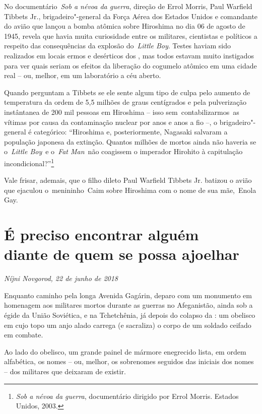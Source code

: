 No documentário~\emph{Sob a névoa da guerra}, direção de Errol Morris,
Paul Warfield Tibbets Jr., brigadeiro"-general da Força Aérea dos Estados
Unidos e comandante do avião que lançou a bomba atômica sobre Hiroshima
no dia 06 de agosto de 1945, revela que havia muita curiosidade entre os
militares, cientistas e políticos a respeito das consequências da
explosão do~\emph{Little Boy}. Testes haviam sido realizados em locais
ermos e desérticos dos , mas todos estavam muito instigados para ver
quais seriam os efeitos da liberação do cogumelo atômico em uma cidade
real -- ou, melhor, em um laboratório a céu aberto.

Quando perguntam a Tibbets se ele sente algum tipo de culpa pelo aumento
de temperatura da ordem de 5,5 milhões de graus centígrados e pela
pulverização instântanea de 200 mil pessoas em Hiroshima -- isso
sem~contabilizarmos~as vítimas por causa da contaminação nuclear por
anos e anos a fio --, o brigadeiro"-general é categórico: ``Hiroshima e,
posteriormente, Nagasaki salvaram a população japonesa da extinção.
Quantos milhões de mortos ainda não haveria se o~\emph{Little Boy}~e
o~\emph{Fat Man}~não coagissem o imperador Hirohito à capitulação
incondicional?''\footnote{\emph{Sob a névoa da guerra}, documentário
  dirigido por Errol Morris. Estados Unidos, 2003.}

Vale frisar, ademais, que o filho dileto Paul Warfield Tibbets Jr.
batizou o avião que ejaculou o~menininho~Caim sobre Hiroshima com o nome
de sua mãe,~Enola Gay.

\chapter*{É preciso encontrar alguém\\diante de quem se possa ajoelhar}

\begin{flushright}
\emph{Níjni Novgorod, 22 de junho de 2018}
\end{flushright}

Enquanto caminho pela longa Avenida Gagárin, deparo com um monumento em
homenagem aos militares mortos durante as guerras no Afeganistão, ainda
sob a égide da União Soviética, e na Tchetchênia, já depois do colapso
da : um obelisco em cujo topo um anjo alado carrega (e sacraliza) o
corpo de um soldado ceifado em combate.

Ao lado do obelisco, um grande painel de mármore enegrecido lista, em
ordem alfabética, os nomes -- ou, melhor, os sobrenomes seguidos das
iniciais dos nomes -- dos militares que deixaram de existir.

